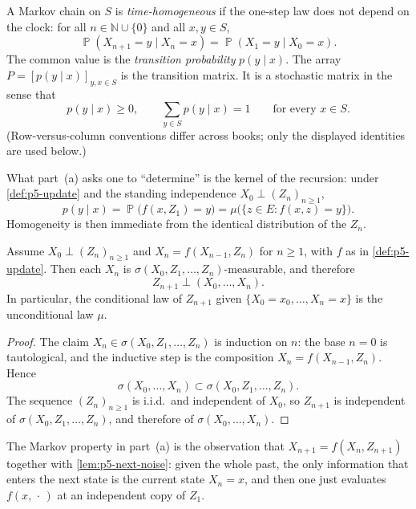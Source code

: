 \documentclass[11pt,a4paper]{article}
\DeclareMathOperator{\Pbb}{\mathbb{P}}
\begin{document}
\begin{definition}
\label{def:p5-hom}
A Markov chain on \(S\) is \emph{time-homogeneous} if the one-step law does not depend on the clock: for all \(n\in\mathbb{N}\cup\{0\}\) and all \(x,y\in S\),
\[
\Pbb(X_{n+1}=y\mid X_n=x)
=
\Pbb(X_1=y\mid X_0=x).
\]
The common value is the \emph{transition probability} \(p(y\mid x)\). The array \(P=[p(y\mid x)]_{y,x\in S}\) is the transition matrix. It is a stochastic matrix in the sense that
\[
p(y\mid x)\ge 0,
\qquad
\sum_{y\in S}p(y\mid x)=1
\qquad\text{for every }x\in S.
\]
(Row-versus-column conventions differ across books; only the displayed identities are used below.)
\end{definition}

What part~(a) asks one to ``determine'' is the kernel of the recursion: under \cref{def:p5-update} and the standing independence \(X_0\perp(Z_n)_{n\ge 1}\),
\[
p(y\mid x)
=
\Pbb\bigl(f(x,Z_1)=y\bigr)
=
\mu\bigl(\{z\in E:f(x,z)=y\}\bigr).
\]
Homogeneity is then immediate from the identical distribution of the \(Z_n\).

\begin{lemma}
\label{lem:p5-next-noise}
Assume \(X_0\perp(Z_n)_{n\ge 1}\) and \(X_n=f(X_{n-1},Z_n)\) for \(n\ge 1\), with \(f\) as in \cref{def:p5-update}. Then each \(X_n\) is \(\sigma(X_0,Z_1,\dots,Z_n)\)-measurable, and therefore
\[
Z_{n+1}\perp(X_0,\dots,X_n).
\]
In particular, the conditional law of \(Z_{n+1}\) given \(\{X_0=x_0,\dots,X_n=x\}\) is the unconditional law \(\mu\).
\end{lemma}

\begin{proof}
The claim \(X_n\in\sigma(X_0,Z_1,\dots,Z_n)\) is induction on \(n\): the base \(n=0\) is tautological, and the inductive step is the composition \(X_n=f(X_{n-1},Z_n)\). Hence
\[
\sigma(X_0,\dots,X_n)\subset\sigma(X_0,Z_1,\dots,Z_n).
\]
The sequence \((Z_n)_{n\ge 1}\) is i.i.d.\ and independent of \(X_0\), so \(Z_{n+1}\) is independent of \(\sigma(X_0,Z_1,\dots,Z_n)\), and therefore of \(\sigma(X_0,\dots,X_n)\).
\end{proof}

The Markov property in part~(a) is the observation that \(X_{n+1}=f(X_n,Z_{n+1})\) together with \cref{lem:p5-next-noise}: given the whole past, the only information that enters the next state is the current state \(X_n=x\), and then one just evaluates \(f(x,\,\cdot\,)\) at an independent copy of \(Z_1\).
\end{document}
